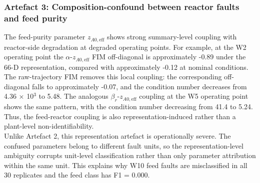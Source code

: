 \documentclass[aps,pre,twocolumn,superscriptaddress,floatfix]{revtex4-2}
\begin{document}
\subsubsection{Artefact 3: Composition-confound between reactor faults and feed
  purity}
\label{sec:wu_artifact3}

The feed-purity parameter $z_{A0,\mathrm{eff}}$ shows strong summary-level coupling with reactor-side degradation at degraded operating points. 
For example, at the W2 operating point the $\alpha$-$z_{A0,\mathrm{eff}}$ 
FIM off-diagonal is approximately -0.89 under the 66-D representation, 
compared with approximately -0.12 at nominal conditions.
The raw-trajectory FIM removes this local coupling: the corresponding off-diagonal 
falls to approximately -0.07, and the condition number decreases from 4.36 $\times$ 
10$^3$ to 5.48. The analogous $\beta_r$-$z_{A0,\mathrm{eff}}$ coupling at the W5 
operating point shows the same pattern, with the condition number decreasing from 
41.4 to 5.24. Thus, the feed-reactor coupling is also representation-induced rather 
than a plant-level non-identifiability.\\
Unlike Artefact 2, this representation artefact is operationally severe. The 
confused parameters belong to different fault units, so the representation-level 
ambiguity corrupts unit-level classification rather than only parameter attribution 
within the same unit. This explains why W10 feed faults are misclassified in all 30 
replicates and the feed class has F1 = 0.000.
\end{document}
